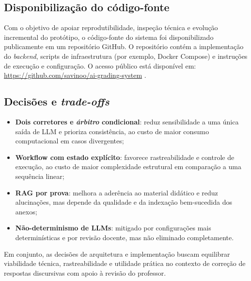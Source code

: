 \subsection{Disponibilização do código-fonte}

Com o objetivo de apoiar reprodutibilidade, inspeção técnica e evolução incremental do protótipo, o código-fonte do sistema foi disponibilizado publicamente em um repositório GitHub. O repositório contém a implementação do \textit{backend}, scripts de infraestrutura (por exemplo, Docker Compose) e instruções de execução e configuração. O acesso público está disponível em: \url{https://github.com/savinoo/ai-grading-system} \cite{ai_grading_system_repo_2026}.

\subsection{Decisões e \textit{trade-offs}}

\begin{itemize}
    \item \textbf{Dois corretores e \textit{árbitro} condicional}: reduz sensibilidade a uma única saída de LLM e prioriza consistência, ao custo de maior consumo computacional em casos divergentes;
    \item \textbf{Workflow com estado explícito}: favorece rastreabilidade e controle de execução, ao custo de maior complexidade estrutural em comparação a uma sequência linear;
    \item \textbf{RAG por prova}: melhora a aderência ao material didático e reduz alucinações, mas depende da qualidade e da indexação bem-sucedida dos anexos;
    \item \textbf{Não-determinismo de LLMs}: mitigado por configurações mais determinísticas e por revisão docente, mas não eliminado completamente.
\end{itemize}

Em conjunto, as decisões de arquitetura e implementação buscam equilibrar viabilidade técnica, rastreabilidade e utilidade prática no contexto de correção de respostas discursivas com apoio à revisão do professor.

